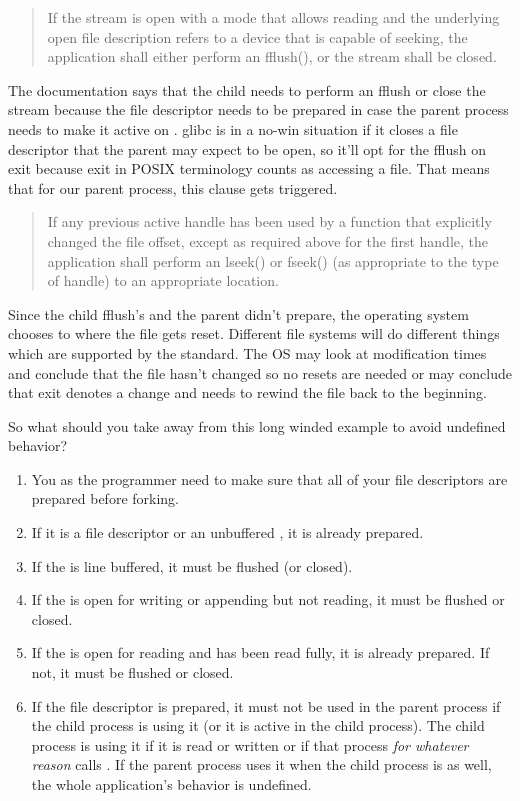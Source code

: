 \begin{quote}
If the stream is open with a mode that allows reading and the underlying open file description refers to a device that is capable of seeking, the application shall either perform an fflush(), or the stream shall be closed.
\end{quote}

The documentation says that the child needs to perform an fflush or close the stream because the file descriptor needs to be prepared in case the parent process needs to make it active on .
glibc is in a no-win situation if it closes a file descriptor that the parent may expect to be open, so it'll opt for the fflush on exit because exit in POSIX terminology counts as accessing a file.
That means that for our parent process, this clause gets triggered.

\begin{quote}
If any previous active handle has been used by a function that explicitly changed the file offset, except as required above for the first handle, the application shall perform an lseek() or fseek() (as appropriate to the type of handle) to an appropriate location.
\end{quote}

Since the child fflush's and the parent didn't prepare, the operating system chooses to where the file gets reset.
Different file systems will do different things which are supported by the standard.
The OS may look at modification times and conclude that the file hasn't changed so no resets are needed or may conclude that exit denotes a change and needs to rewind the file back to the beginning.

So what should you take away from this long winded example to avoid undefined behavior?

\begin{enumerate}
\item You as the programmer need to make sure that all of your file descriptors are prepared before forking.
\item If it is a file descriptor or an unbuffered , it is already prepared.
\item If the  is line buffered, it must be flushed (or closed).
\item If the  is open for writing or appending but not reading, it must be flushed or closed.
\item If the  is open for reading and has been read fully, it is already prepared. If not, it must be flushed or closed.
\item If the file descriptor is prepared, it must not be used in the parent process if the child process is using it (or it is active in the child process). The child process is using it if it is read or written or if that process \textit{for whatever reason} calls . If the parent process uses it when the child process is as well, the whole application's behavior is undefined.
\end{enumerate}

